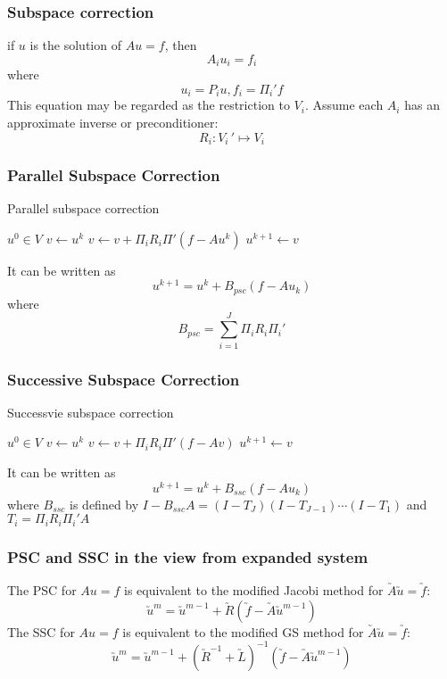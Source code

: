 \begin{frame}
\frametitle{Subspace correction}
if $u$ is the solution of $Au=f$, then
$$A_iu_i=f_i$$
where $$u_i=P_iu, f_i=\Pi_i'f$$
This equation may be regarded as the restriction to $V_i$.
Assume each $A_i$ has an approximate inverse or preconditioner:
$$R_i: V_i\,'\mapsto V_i$$
\end{frame}

\begin{frame}
\frametitle{Parallel Subspace Correction}
\begin{algorithm}[H]
\caption{Parallel subspace correction}
\begin{algorithmic}[1]
\REQUIRE $u^0 \in V$
\REPEAT
\STATE $v \leftarrow u^k$
\STATE $v \leftarrow v + \Pi_i R_i \Pi'(f-Au^k)$ 
\ENDFOR
\STATE $u^{k+1} \leftarrow v$ 
\end{algorithmic}
\end{algorithm}
It can be written as
$$u^{k+1}=u^{k}+B_{psc}(f-Au_{k})$$
where
$$B_{psc}=\sum_{i=1}^{J}\Pi_i R_i \Pi_i'$$
\end{frame}

\begin{frame}
\frametitle{Successive Subspace Correction}
\begin{algorithm}[H]
\caption{Successvie subspace correction}
\begin{algorithmic}[1]
\REQUIRE $u^0 \in V$
\REPEAT
\STATE $v \leftarrow u^k$
\STATE $v \leftarrow v + \Pi_i R_i \Pi'(f-Av)$ 
\ENDFOR
\STATE $u^{k+1} \leftarrow v$ 
\end{algorithmic}
\end{algorithm}
It can be written as
$$u^{k+1}=u^{k}+B_{ssc}(f-Au_{k})$$
where $B_{ssc}$ is defined by
$I-B_{ssc}A=(I-T_{J})(I-T_{J-1})\cdots(I-T_1)$ and $T_i=\Pi_i R_i \Pi_i' A$
\end{frame}

\begin{frame}
\frametitle{PSC and SSC in the view from expanded system}
\begin{theorem}
The PSC for $Au=f$ is equivalent to the modified Jacobi method for 
$\utilde{A}\utilde{u}=\utilde{f}$:
$$\utilde{u}^m=\utilde{u}^{m-1}+\utilde{R}
(\utilde{f}-\utilde{A}\utilde{u}^{m-1})$$
The SSC for $Au=f$ is equivalent to the modified GS method for
$\utilde{A}\utilde{u}=\utilde{f}$:
$$\utilde{u}^m=\utilde{u}^{m-1}+(\utilde{R}^{-1}+\utilde{L})^{-1}
(\utilde{f}-\utilde{A}\utilde{u}^{m-1})$$
\end{theorem}
\end{frame}

